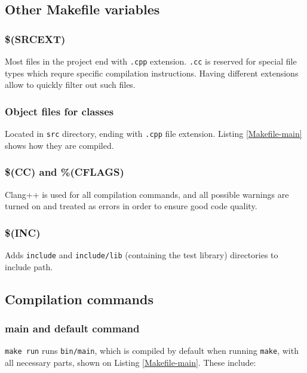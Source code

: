 \documentclass{elteikthesis}[2018/06/06]
\newcommand*{\code}{\lstinline[keywordstyle=\color{violet}, basicstyle=\color{violet}]}
\begin{document}
\subsection{Other Makefile variables}
\label{sec-3-2-2}
\subsubsection{\$(SRCEXT)}
\label{sec-3-2-2-1}
Most files in the project end with \code{.cpp} extension. \code{.cc} is reserved for special file types which requre specific compilation instructions. Having different extensions allow to quickly filter out such files. \\
\subsubsection{Object files for classes}
\label{sec-3-2-2-2}
Located in \code{src} directory, ending with \code{.cpp} file extension. Listing \ref{Makefile-main} shows how they are compiled. \\
\subsubsection{\$(CC) and \%(CFLAGS)}
\label{sec-3-2-2-3}
Clang++ is used for all compilation commands, and all possible warnings are turned on and treated as errors in order to ensure good code quality. \\
\subsubsection{\$(INC)}
\label{sec-3-2-2-4}
Adds \code{include} and \code{include/lib} (containing the test library) directories to include path. \\
\subsection{Compilation commands}
\label{sec-3-2-3}
\subsubsection{main and default command}
\label{sec-3-2-3-1}
\code{make run} runs \code{bin/main}, which is compiled by default when running \code{make}, with all necessary parts, shown on Listing \ref{Makefile-main}. These include: \\
\end{document}

